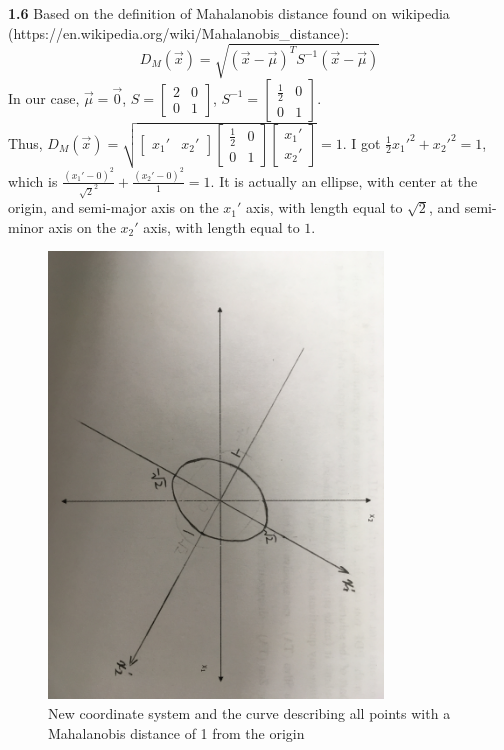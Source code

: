 \documentclass[a4paper]{article}
\begin{document}
\begin{spacing}{2.0}
	\noindent	
	\textbf{1.6}  
	Based on the definition of Mahalanobis distance found on wikipedia (https://en.wikipedia.org/wiki/Mahalanobis\_distance):
	$$D_M(\vec{x}) = \sqrt{(\vec{x}-\vec{\mu})^TS^{-1}(\vec{x}-\vec{\mu})}$$
	In our case, $\vec{\mu} = \vec{0}$, $S = \begin{bmatrix} 2 & 0 \\ 0 & 1\end{bmatrix}$, $S^{-1} = \begin{bmatrix} \frac{1}{2} & 0 \\ 0 & 1\end{bmatrix}$. \\
	Thus, $D_M(\vec{x}) = \sqrt{\left[\begin{matrix} x_1'& x_2'\end{matrix}\right] \begin{bmatrix} \frac{1}{2} & 0 \\ 0 & 1\end{bmatrix} \begin{bmatrix} x_1'
	\\x_2'\end{bmatrix}} = 1$. I got $\displaystyle\frac{1}{2}x_1'^2 + x_2'^2 = 1$, which is $\displaystyle\frac{(x_1'-0)^2}{\sqrt{2}^2} + 					\displaystyle\frac{(x_2'-0)^2}{1} = 1$. It is actually an ellipse, with center at the origin, and semi-major axis on the $x_1'$ axis, with length equal to $		\sqrt{2}$, and semi-minor axis on the $x_2'$ axis, with length equal to $1$.
	\begin{figure}[H]
	    \centering
	        \includegraphics[width=3.5in]{1.jpeg}
	        \caption{New coordinate system and the curve describing all points with a Mahalanobis distance of 1 from the origin}
	        \label{fig:side:a}
	  \end{figure}
	


\end{spacing}
\end{document}
